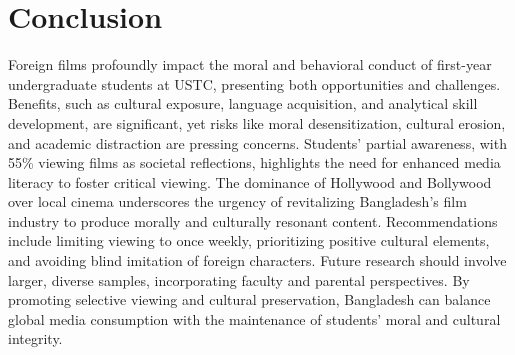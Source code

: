 \documentclass[12pt]{article}
\begin{document}
\section{Conclusion}
Foreign films profoundly impact the moral and behavioral conduct of first-year undergraduate students at USTC, presenting both opportunities and challenges. Benefits, such as cultural exposure, language acquisition, and analytical skill development, are significant, yet risks like moral desensitization, cultural erosion, and academic distraction are pressing concerns. Students’ partial awareness, with 55\% viewing films as societal reflections, highlights the need for enhanced media literacy to foster critical viewing. The dominance of Hollywood and Bollywood over local cinema underscores the urgency of revitalizing Bangladesh’s film industry to produce morally and culturally resonant content. Recommendations include limiting viewing to once weekly, prioritizing positive cultural elements, and avoiding blind imitation of foreign characters. Future research should involve larger, diverse samples, incorporating faculty and parental perspectives. By promoting selective viewing and cultural preservation, Bangladesh can balance global media consumption with the maintenance of students’ moral and cultural integrity.

\end{document}
